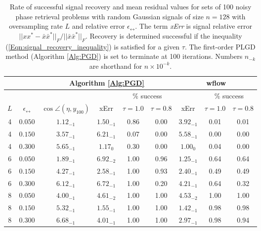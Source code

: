 \begin{table}[H]
\centering
\begin{tabular}{ |cc|c|c|cc|c|cc| }
\hline
	\multicolumn{2}{|c|}{}
	&	\multicolumn{4}{c|}{Algorithm \ref{Alg:PGD}} 	
		&	\multicolumn{3}{c|}{wflow} 	  \\
 \hline
 	&&&&	\multicolumn{2}{c|}{\% success}
 				&&	\multicolumn{2}{c|}{\% success}	\\
$L$	&	$\epsilon_\rel$ 	&	$\cos \angle (\eta, y_{100})$ &  xErr &	$\tau= 1.0$ & $\tau= 0.8$	 & xErr &	$\tau= 1.0$ & $\tau= 0.8$	 \\
\hline
  4 & $0.050$ & $1.12_{-1}$ & $1.50_{-1}$ &  0.86 & 0.00 & $3.92_{-1}$ & 0.01 & 0.01	\\
  4 & $0.150$ & $3.57_{-1}$ & $6.21_{-1}$ &  0.07 & 0.00 & $5.58_{-1}$ & 0.00 & 0.00	\\
   4 & $0.300$ & $5.65_{-1}$ & $1.17_{0}$ &  0.30 & 0.00 & $1.00_{0}$ & 0.04 & 0.00	\\
\hline
  6 & $0.050$ & $1.89_{-1}$ & $6.92_{-2}$ &  1.00 & 0.96 & $1.25_{-1}$ & 0.64 & 0.64	\\
  6 & $0.150$ & $4.27_{-1}$ & $2.58_{-1}$ &  1.00 & 0.93 & $2.40_{-1}$ & 0.49 & 0.49	\\
  6 & $0.300$ & $6.12_{-1}$ & $6.72_{-1}$ &  1.00 & 0.20 & $4.21_{-1}$ & 0.64 & 0.32	\\
\hline
  8 & $0.050$ & $4.00_{-1}$ & $4.61_{-2}$ &  1.00 & 1.00 & $4.53_{-2}$ & 1.00 & 1.00	\\
  8 & $0.150$ & $5.32_{-1}$ & $1.55_{-1}$ &  1.00 & 1.00 & $1.42_{-1}$ & 0.98 & 0.98	\\
  8 & $0.300$ & $6.68_{-1}$ & $4.01_{-1}$ &  1.00 & 1.00 & $2.97_{-1}$ & 0.98 & 0.94	\\
\hline

\end{tabular}
\caption{Rate of successful signal recovery and mean residual values for sets of 100 noisy phase retrieval problems with random Gaussian signals of size $n = 128$ with oversampling rate $L$ and relative error $\epsilon_\rel$.  The term \textit{xErr} is signal relative error $||xx^*- \bar{x}\bar{x}^*||_F / ||\bar{x}\bar{x}^*||_F$.  Recovery is determined successful if the inequality (\ref{Eqn:signal_recovery_inequality}) is satisfied for a given $\tau$.  The first-order PLGD method (Algorithm \ref{Alg:PGD}) is set to terminate at 100 iterations. Numbers $n_{-k}$ are shorthand for $n \times 10^{-k}$.} \label{Tab:relative_errors_saga_vs_wflow}
\end{table}  



